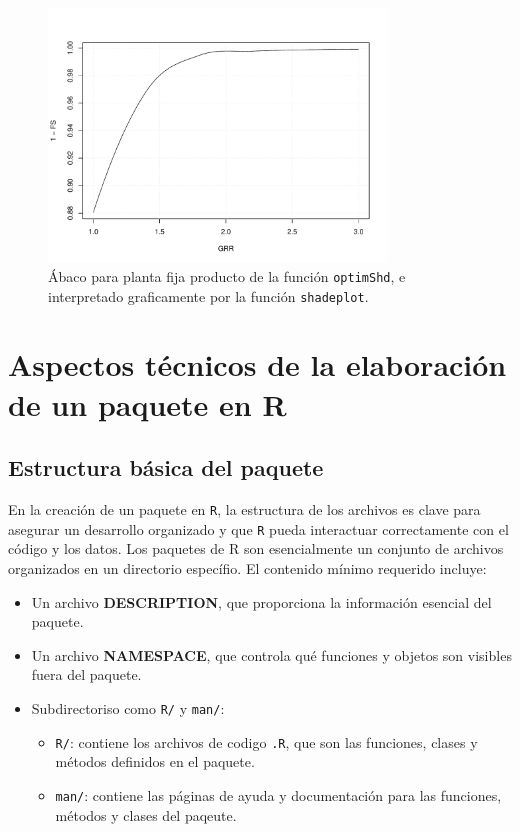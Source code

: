 \begin{figure}[!htb]
\centering
\includegraphics[width=0.8\textwidth]{figuras/codigo-optimshdfixed.pdf}
\caption{Ábaco para planta fija producto de la función \texttt{optimShd}, e interpretado graficamente por la función \texttt{shadeplot}.}
\end{figure}


\section{Aspectos técnicos de la elaboración de un paquete en R}
\label{sec:org87aed23}
\label{sec:aspectos-tecnicos}
\subsection{Estructura básica del paquete}
\label{sec:org3441552}
\label{subsec:estructura-paquete}
En la creación de un paquete en \texttt{R}, la estructura de los archivos es clave para asegurar un desarrollo organizado y que \texttt{R} pueda interactuar correctamente con el código y  los datos. Los paquetes de R son esencialmente un conjunto de archivos organizados en un directorio específio. El contenido mínimo requerido incluye:
\begin{itemize}
\item Un archivo \textbf{DESCRIPTION}, que proporciona la información esencial del paquete.
\item Un archivo \textbf{NAMESPACE}, que controla qué funciones y objetos son visibles fuera del paquete.
\item Subdirectoriso como \texttt{R/} y \texttt{man/}:
\begin{itemize}
\item \texttt{R/}: contiene los archivos de codigo \texttt{.R}, que son las funciones, clases y métodos definidos en el paquete.
\item \texttt{man/}: contiene las páginas de ayuda y documentación para las funciones, métodos y clases del paqeute.
\end{itemize}
\end{itemize}


